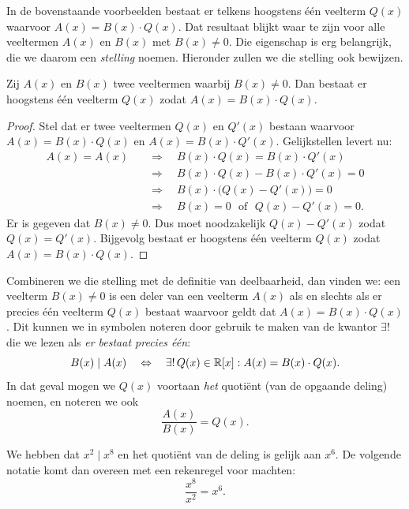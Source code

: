 \documentclass{ximera}
\begin{document}
In de bovenstaande voorbeelden bestaat er telkens hoogstens \'e\'en veelterm $Q(x)$ waarvoor $A(x) = B(x)\cdot Q(x)$. Dat resultaat blijkt waar te zijn voor alle veeltermen $A(x)$ en $B(x)$ met $B(x) \neq 0$. Die eigenschap is erg belangrijk, die we daarom een {\em stelling} noemen. Hieronder zullen we die stelling ook bewijzen. 

\begin{theorem} 
Zij $A(x)$ en $B(x)$ twee veeltermen waarbij $B(x) \neq 0$. Dan bestaat er hoogstens \'e\'en veelterm $Q(x)$ zodat $A(x) = B(x)\cdot Q(x)$. 
\end{theorem} 


\begin{proof}

Stel dat er twee veeltermen $Q(x)$ en $Q'(x)$ bestaan waarvoor $A(x) = B(x)\cdot Q(x)$ en $A(x) = B(x)\cdot Q'(x)$. Gelijkstellen levert nu:
\begin{align*}
A(x) = A(x) \quad & \Rightarrow \quad B(x)\cdot Q(x) = B(x)\cdot Q'(x) \\
& \Rightarrow \quad B(x)\cdot Q(x) - B(x)\cdot Q'(x) = 0 \\
& \Rightarrow \quad B(x) \cdot \bigl(Q(x) - Q'(x) \bigr) = 0 \\
& \Rightarrow \quad B(x) = 0 \,\,\text{ of } \,\, Q(x) - Q'(x) = 0. 
\end{align*}
Er is gegeven dat $B(x) \neq 0$. Dus moet noodzakelijk $Q(x) - Q'(x)$ zodat $Q(x) = Q'(x)$. Bijgevolg bestaat er hoogstens \'e\'en veelterm $Q(x)$ zodat $A(x) = B(x)\cdot Q(x)$.

\end{proof}


Combineren we die stelling met de definitie van deelbaarheid, dan vinden we: een veelterm $B(x) \neq 0$ is een deler van een veelterm $A(x)$ als en slechts als er precies \'e\'en veelterm $Q(x)$ bestaat waarvoor geldt dat $A(x) = B(x)\cdot Q(x)$. Dit kunnen we in symbolen noteren door gebruik te maken van de kwantor $\exists!$ die we lezen als {\em er bestaat precies \'e\'en}:
\[
B(x) \mid A(x) \quad \Leftrightarrow \quad \exists! \, Q(x) \in \mathbb{R}[x]: A(x) = B(x)\cdot Q(x).
\] 
In dat geval mogen we $Q(x)$ voortaan {\em het} quoti\"ent (van de opgaande deling) noemen, en noteren we ook 
\[
\frac{A(x)}{B(x)} = Q(x).
\]

\begin{example} 
We hebben dat $x^2 \mid x^8$ en het quoti\"ent van de deling is gelijk aan $x^6$. De volgende notatie komt dan overeen met een rekenregel voor machten:
\[
\frac{x^8}{x^2} = x^6.
\]
\end{example} 
\end{document}
